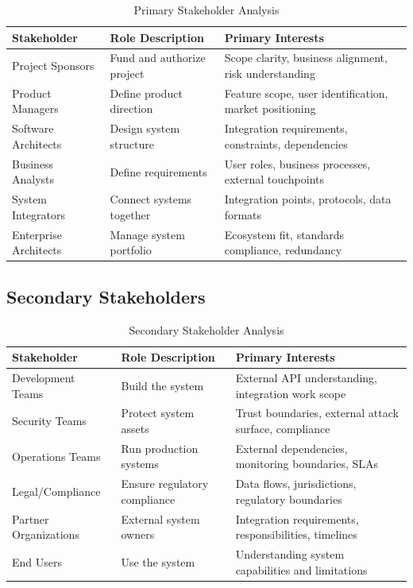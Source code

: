 \documentclass[11pt,letterpaper]{article}
\begin{document}
\begin{table}[H]
\centering
\caption{Primary Stakeholder Analysis}
\small
\begin{tabular}{@{}L{3.2cm}L{3.6cm}L{\dimexpr\linewidth-6.8cm-4\tabcolsep\relax}@{}}
\toprule
\textbf{Stakeholder} & \textbf{Role Description} & \textbf{Primary Interests} \\
\midrule
Project Sponsors & Fund and authorize project & Scope clarity, business alignment, risk understanding \\
\addlinespace
Product Managers & Define product direction & Feature scope, user identification, market positioning \\
\addlinespace
Software Architects & Design system structure & Integration requirements, constraints, dependencies \\
\addlinespace
Business Analysts & Define requirements & User roles, business processes, external touchpoints \\
\addlinespace
System Integrators & Connect systems together & Integration points, protocols, data formats \\
\addlinespace
Enterprise Architects & Manage system portfolio & Ecosystem fit, standards compliance, redundancy \\
\bottomrule
\end{tabular}
\end{table}

\subsection{Secondary Stakeholders}

\begin{table}[H]
\centering
\caption{Secondary Stakeholder Analysis}
\small
\begin{tabular}{@{}L{2.6cm}L{3.6cm}L{7cm}@{}}
\toprule
\textbf{Stakeholder} & \textbf{Role Description} & \textbf{Primary Interests} \\
\midrule
Development Teams & Build the system & External API understanding, integration work scope \\
\addlinespace
Security Teams & Protect system assets & Trust boundaries, external attack surface, compliance \\
\addlinespace
Operations Teams & Run production systems & External dependencies, monitoring boundaries, SLAs \\
\addlinespace
Legal/\allowbreak{}Compliance & Ensure regulatory compliance & Data flows, jurisdictions, regulatory boundaries \\
\addlinespace
Partner Organizations & External system owners & Integration requirements, responsibilities, timelines \\
\addlinespace
End Users & Use the system & Understanding system capabilities and limitations \\
\bottomrule
\end{tabular}
\end{table}
\end{document}
